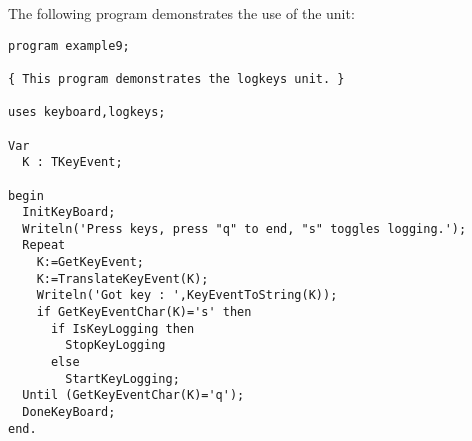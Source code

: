 The following program demonstrates the use of the unit:
\begin{verbatim}
program example9;

{ This program demonstrates the logkeys unit. }

uses keyboard,logkeys;

Var
  K : TKeyEvent;

begin
  InitKeyBoard;
  Writeln('Press keys, press "q" to end, "s" toggles logging.');
  Repeat
    K:=GetKeyEvent;
    K:=TranslateKeyEvent(K);
    Writeln('Got key : ',KeyEventToString(K));
    if GetKeyEventChar(K)='s' then
      if IsKeyLogging then
        StopKeyLogging
      else
        StartKeyLogging;  
  Until (GetKeyEventChar(K)='q');
  DoneKeyBoard;
end.
\end{verbatim}
